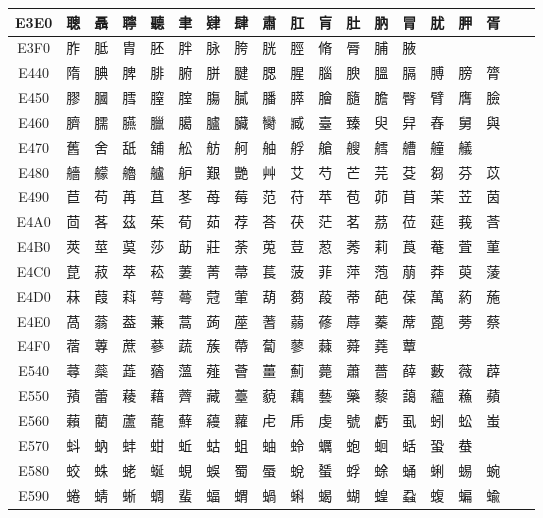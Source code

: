 \begin{table}[H]
\begin{tabular}{|Sc|*{16}{>{\centering\arraybackslash}p{1em}|}>{\centering\arraybackslash}p{2.5em}|}
E3E0 & 聰 & 聶 & 聹 & 聽 & 聿 & 肄 & 肆 & 肅 & 肛 & 肓 & 肚 & 肭 & 冐 & 肬 & 胛 & 胥 \\ \hline
E3F0 & 胙 & 胝 & 胄 & 胚 & 胖 & 脉 & 胯 & 胱 & 脛 & 脩 & 脣 & 脯 & 腋 & & & \\ \hline
E440 & 隋 & 腆 & 脾 & 腓 & 腑 & 胼 & 腱 & 腮 & 腥 & 腦 & 腴 & 膃 & 膈 & 膊 & 膀 & 膂 \\ \hline
E450 & 膠 & 膕 & 膤 & 膣 & 腟 & 膓 & 膩 & 膰 & 膵 & 膾 & 膸 & 膽 & 臀 & 臂 & 膺 & 臉 \\ \hline
E460 & 臍 & 臑 & 臙 & 臘 & 臈 & 臚 & 臟 & 臠 & 臧 & 臺 & 臻 & 臾 & 舁 & 舂 & 舅 & 與 \\ \hline
E470 & 舊 & 舍 & 舐 & 舖 & 舩 & 舫 & 舸 & 舳 & 艀 & 艙 & 艘 & 艝 & 艚 & 艟 & 艤 & \\ \hline
E480 & 艢 & 艨 & 艪 & 艫 & 舮 & 艱 & 艷 & 艸 & 艾 & 芍 & 芒 & 芫 & 芟 & 芻 & 芬 & 苡 \\ \hline
E490 & 苣 & 苟 & 苒 & 苴 & 苳 & 苺 & 莓 & 范 & 苻 & 苹 & 苞 & 茆 & 苜 & 茉 & 苙 & 茵 \\ \hline
E4A0 & 茴 & 茖 & 茲 & 茱 & 荀 & 茹 & 荐 & 荅 & 茯 & 茫 & 茗 & 茘 & 莅 & 莚 & 莪 & 莟 \\ \hline
E4B0 & 莢 & 莖 & 茣 & 莎 & 莇 & 莊 & 荼 & 莵 & 荳 & 荵 & 莠 & 莉 & 莨 & 菴 & 萓 & 菫 \\ \hline
E4C0 & 菎 & 菽 & 萃 & 菘 & 萋 & 菁 & 菷 & 萇 & 菠 & 菲 & 萍 & 萢 & 萠 & 莽 & 萸 & 蔆 \\ \hline
E4D0 & 菻 & 葭 & 萪 & 萼 & 蕚 & 蒄 & 葷 & 葫 & 蒭 & 葮 & 蒂 & 葩 & 葆 & 萬 & 葯 & 葹 \\ \hline
E4E0 & 萵 & 蓊 & 葢 & 蒹 & 蒿 & 蒟 & 蓙 & 蓍 & 蒻 & 蓚 & 蓐 & 蓁 & 蓆 & 蓖 & 蒡 & 蔡 \\ \hline
E4F0 & 蓿 & 蓴 & 蔗 & 蔘 & 蔬 & 蔟 & 蔕 & 蔔 & 蓼 & 蕀 & 蕣 & 蕘 & 蕈 & & & \\ \hline
E540 & 蕁 & 蘂 & 蕋 & 蕕 & 薀 & 薤 & 薈 & 薑 & 薊 & 薨 & 蕭 & 薔 & 薛 & 藪 & 薇 & 薜 \\ \hline
E550 & 蕷 & 蕾 & 薐 & 藉 & 薺 & 藏 & 薹 & 藐 & 藕 & 藝 & 藥 & 藜 & 藹 & 蘊 & 蘓 & 蘋 \\ \hline
E560 & 藾 & 藺 & 蘆 & 蘢 & 蘚 & 蘰 & 蘿 & 虍 & 乕 & 虔 & 號 & 虧 & 虱 & 蚓 & 蚣 & 蚩 \\ \hline
E570 & 蚪 & 蚋 & 蚌 & 蚶 & 蚯 & 蛄 & 蛆 & 蚰 & 蛉 & 蠣 & 蚫 & 蛔 & 蛞 & 蛩 & 蛬 & \\ \hline
E580 & 蛟 & 蛛 & 蛯 & 蜒 & 蜆 & 蜈 & 蜀 & 蜃 & 蛻 & 蜑 & 蜉 & 蜍 & 蛹 & 蜊 & 蜴 & 蜿 \\ \hline
E590 & 蜷 & 蜻 & 蜥 & 蜩 & 蜚 & 蝠 & 蝟 & 蝸 & 蝌 & 蝎 & 蝴 & 蝗 & 蝨 & 蝮 & 蝙 & 蝓 \\ \hline

\end{tabular}
\end{table}
